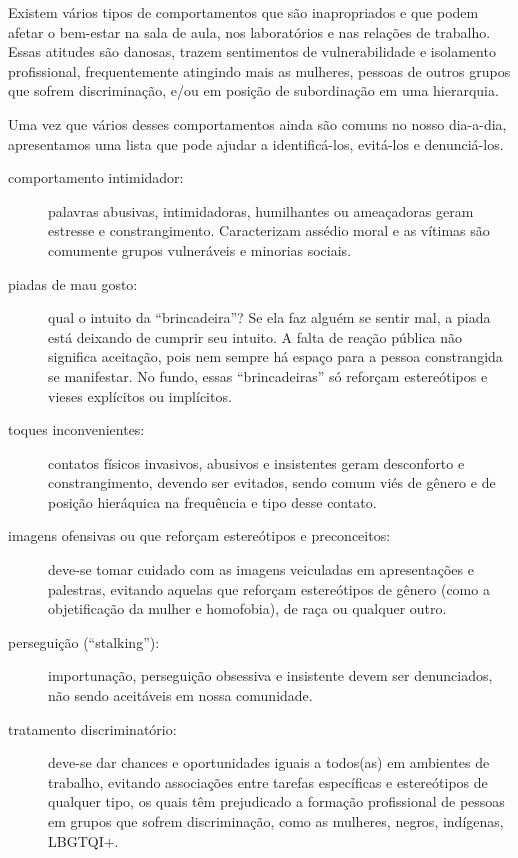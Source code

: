 \documentclass[twoside a4paper 12pt]{report}
\begin{document}
Existem vários tipos de comportamentos que são inapropriados e que podem afetar o bem-estar na sala de aula, nos laboratórios e nas relações de trabalho. Essas atitudes são danosas, trazem sentimentos de vulnerabilidade e isolamento profissional, frequentemente atingindo mais as mulheres, pessoas de outros grupos que sofrem discriminação, e/ou em posição de subordinação em uma hierarquia. 

Uma vez que vários desses comportamentos ainda são comuns no nosso dia-a-dia, apresentamos uma lista que pode ajudar a identificá-los, evitá-los e denunciá-los.

\begin{description}

\item[comportamento intimidador:] palavras abusivas, intimidadoras, humilhantes ou ameaçadoras geram estresse e constrangimento. Caracterizam assédio moral e as vítimas são comumente grupos vulneráveis e minorias sociais.

\item[piadas de mau gosto:] qual o intuito da “brincadeira”? Se ela faz alguém se sentir mal, a piada está deixando de cumprir seu intuito. A falta de reação pública não significa aceitação, pois nem sempre há espaço para a pessoa constrangida se manifestar. No fundo, essas “brincadeiras” só reforçam estereótipos e vieses explícitos ou implícitos.

\item[toques inconvenientes:] contatos físicos invasivos, abusivos e insistentes geram desconforto e constrangimento, devendo ser evitados, sendo comum viés de gênero e de posição hieráquica na frequência e tipo desse contato.

\item[imagens ofensivas ou que reforçam estereótipos e preconceitos:] deve-se tomar cuidado com as imagens veiculadas em apresentações e palestras, evitando aquelas que reforçam estereótipos de gênero (como a objetificação da mulher e homofobia), de raça ou qualquer outro.

\item[perseguição (“stalking”):] importunação, perseguição obsessiva e insistente devem ser denunciados, não sendo aceitáveis em nossa comunidade.

\item[tratamento discriminatório:] deve-se dar chances e oportunidades iguais a todos(as) em ambientes de trabalho, evitando associações entre tarefas específicas e estereótipos de qualquer tipo, os quais têm prejudicado a formação profissional de pessoas em grupos que sofrem discriminação, como as mulheres, negros, indígenas, LBGTQI+. 
\end{description}
\end{document}
